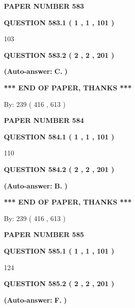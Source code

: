 \documentclass{ctexart}
\begin{document}
   
 {\textbf{ \Large{ PAPER NUMBER  583  }}}
   
   
   
   
  
  
{\textbf{\large{QUESTION
583.1 
 ( 1 , 1 , 101 )
}}}

103
  
  
{\textbf{\large{QUESTION
583.2 
 ( 2 , 2 , 201 )
}}}
 
 
{\textbf{(Auto-answer:}}
{\textbf{\large{
C.}}}
{\textbf{)}}
 
 
   
   
   
   
\vspace{1.0in} 
{\textbf{\large{ *** END OF PAPER, THANKS *** }}} 
   
   
\hspace{1.0in} By: 
 239 ( 416 ,  613 )
   
   
   
   
\newpage 
\setcounter{page}{ 
   584001 } 
   
   
 {\textbf{ \Large{ PAPER NUMBER  584  }}}
   
   
   
   
  
  
{\textbf{\large{QUESTION
584.1 
 ( 1 , 1 , 101 )
}}}

110
  
  
{\textbf{\large{QUESTION
584.2 
 ( 2 , 2 , 201 )
}}}
 
 
{\textbf{(Auto-answer:}}
{\textbf{\large{
B.}}}
{\textbf{)}}
 
 
   
   
   
   
\vspace{1.0in} 
{\textbf{\large{ *** END OF PAPER, THANKS *** }}} 
   
   
\hspace{1.0in} By: 
 239 ( 416 ,  613 )
   
   
   
   
\newpage 
\setcounter{page}{ 
   585001 } 
   
   
 {\textbf{ \Large{ PAPER NUMBER  585  }}}
   
   
   
   
  
  
{\textbf{\large{QUESTION
585.1 
 ( 1 , 1 , 101 )
}}}

124
  
  
{\textbf{\large{QUESTION
585.2 
 ( 2 , 2 , 201 )
}}}
 
 
{\textbf{(Auto-answer:}}
{\textbf{\large{
F.}}}
{\textbf{)}}
 
\end{document}
